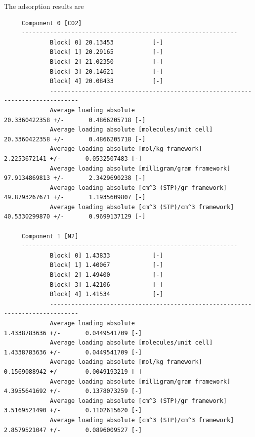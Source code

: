 \noindent
The adsorption results are
\begin{tiny}
\begin{verbatim}
     Component 0 [CO2]
     -------------------------------------------------------------
             Block[ 0] 20.13453           [-]
             Block[ 1] 20.29165           [-]
             Block[ 2] 21.02350           [-]
             Block[ 3] 20.14621           [-]
             Block[ 4] 20.08433           [-]
             ------------------------------------------------------------------------------
             Average loading absolute                             20.3360422358 +/-       0.4866205718 [-]
             Average loading absolute [molecules/unit cell]       20.3360422358 +/-       0.4866205718 [-]
             Average loading absolute [mol/kg framework]                  2.2253672141 +/-       0.0532507483 [-]
             Average loading absolute [milligram/gram framework]         97.9134869813 +/-       2.3429690238 [-]
             Average loading absolute [cm^3 (STP)/gr framework]          49.8793267671 +/-       1.1935609807 [-]
             Average loading absolute [cm^3 (STP)/cm^3 framework]        40.5330299870 +/-       0.9699137129 [-]
     
     Component 1 [N2]
     -------------------------------------------------------------
             Block[ 0] 1.43833            [-]
             Block[ 1] 1.40067            [-]
             Block[ 2] 1.49400            [-]
             Block[ 3] 1.42106            [-]
             Block[ 4] 1.41534            [-]
             ------------------------------------------------------------------------------
             Average loading absolute                              1.4338783636 +/-       0.0449541709 [-]
             Average loading absolute [molecules/unit cell]        1.4338783636 +/-       0.0449541709 [-]
             Average loading absolute [mol/kg framework]                  0.1569088942 +/-       0.0049193219 [-]
             Average loading absolute [milligram/gram framework]          4.3955641692 +/-       0.1378073259 [-]
             Average loading absolute [cm^3 (STP)/gr framework]           3.5169521490 +/-       0.1102615620 [-]
             Average loading absolute [cm^3 (STP)/cm^3 framework]         2.8579521047 +/-       0.0896009527 [-]
\end{verbatim}
\end{tiny}

